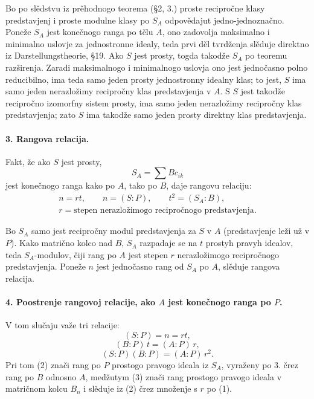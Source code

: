 \documentclass[11pt]{article}
\newcommand{\foreign}[1]{#1}
\begin{document}
Bo po slědstvu iz prěhodnogo teorema (§2, 3.) proste recipročne klasy predstavjenj i proste modulne klasy po \(S_A\) odpovědajut jedno-jednoznačno. Poneže \(S_A\) jest konečnogo ranga po tělu \(A\), ono zadovolja maksimalno i minimalno uslovje za jednostronne idealy, teda prvi děl tvrdženja slěduje direktno iz \foreign{Darstellungstheorie}, §19. Ako \(S\) jest prosty, togda takodže \(S_A\) po teoremu razširenja. Zaradi maksimalnogo i minimalnogo uslovja ono jest jednočasno polno reducibilno, ima teda samo jeden prosty jednostronny idealny klas; to jest, \(S\) ima samo jeden nerazložimy recipročny klas predstavjenja v \(A\). S \(S\) jest takodže recipročno izomorfny sistem prosty, ima samo jeden nerazložimy recipročny klas predstavjenja; zato \(S\) ima takodže samo jeden prosty direktny klas predstavjenja.

\paragraph{3. Rangova relacija.}
Fakt, že ako \(S\) jest prosty,
\[
        S_A=\sum Bc_{ik}
\]
jest konečnogo ranga kako po \(A\), tako po \(B\), daje rangovu relaciju:
\[
\begin{gathered}
        n=rt,\qquad n=(S:P),\qquad t^2=(S_A:B),\\
        r=\text{stepen nerazložimogo recipročnogo predstavjenja}.
\end{gathered}                                                            \tag{1}
\]

Bo \(S_A\) samo jest recipročny modul predstavjenja za \(S\) v \(A\) (predstavjenje leži už v \(P\)). Kako matrično kolco nad \(B\), \(S_A\) razpadaje se na \(t\) prostyh pravyh idealov, teda \(S_A\)-modulov, čiji rang po \(A\) jest stepen \(r\) nerazložimogo recipročnogo predstavjenja. Poneže \(n\) jest jednočasno rang od \(S_A\) po \(A\), slěduje rangova relacija.

\paragraph{4. Poostrenje rangovoj relacije, ako \(A\) jest konečnogo ranga po \(P\).}
V tom slučaju važe tri relacije:
\[
        (S:P)=n=rt,                                                     \tag{1}
\]
\[
        (B:P)\,t=(A:P)\,r,                                               \tag{2}
\]
\[
        (S:P)(B:P)=(A:P)\,r^2.                                           \tag{3}
\]
Pri tom (2) znači rang po \(P\) prostogo pravogo ideala iz \(S_A\), vyraženy po 3. črez rang po \(B\) odnosno \(A\), medžutym (3) znači rang prostogo pravogo ideala v matričnom kolcu \(B_n\) i slěduje iz (2) črez množenje s \(r\) po (1).
\end{document}
